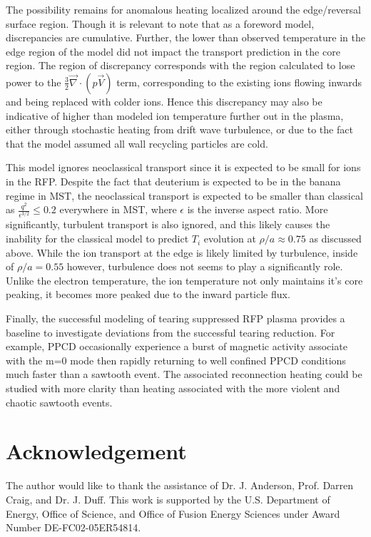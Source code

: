 \documentclass[aip, pop, preprint]{revtex4-1}
\begin{document}
The possibility remains for anomalous heating localized around the edge/reversal surface region. Though it is relevant to note that as a foreword model, discrepancies are cumulative. Further, the lower than observed temperature in the edge region of the model did not impact the transport prediction in the core region. The region of discrepancy corresponds with the region calculated to lose power to the $\frac{3}{2}\vec{\nabla}\cdot(p\vec{V})$ term, corresponding to the existing ions flowing inwards and being replaced with colder ions. Hence this discrepancy may also be indicative of higher than modeled ion temperature further out in the plasma, either through stochastic heating from drift wave turbulence\cite{Fiksel2009}, or due to the fact that the model assumed all wall recycling particles are cold. 

This model ignores neoclassical transport since it is expected
to be small for ions in the RFP. Despite the fact that deuterium is expected to be in the
banana regime in MST\cite{Kumar2012a}, the neoclassical transport is expected to be smaller
than classical as $\frac{q^2}{\epsilon^{3/2}} \leq 0.2$ everywhere in MST, where $\epsilon$ is the inverse aspect ratio.
More significantly, turbulent transport is also ignored, and
this likely causes the inability for the classical model to predict $T_i$
evolution at $\rho /a \approx 0.75$ as discussed above.  While the ion transport at the edge is likely limited by turbulence, inside of $\rho/a = 0.55$ however, turbulence does not seems to play a significantly role. Unlike the electron temperature, the ion temperature not only maintains it's core peaking, it becomes more peaked due to the inward particle flux.

Finally, the successful modeling of tearing suppressed RFP plasma provides a baseline to investigate deviations from the successful tearing reduction. For example, PPCD occasionally experience a burst of magnetic activity associate with the m=0 mode then rapidly returning to well confined PPCD conditions much faster than a sawtooth event. The associated reconnection heating could be studied with more clarity than heating associated with the more violent and chaotic sawtooth events. 

\section*{Acknowledgement}
The author would like to thank the assistance of Dr. J. Anderson,  Prof. Darren Craig, and Dr. J. Duff. This work is supported by the U.S. Department of Energy, Office of Science, and
Office of Fusion Energy Sciences under Award Number DE-FC02-05ER54814.
\end{document}
